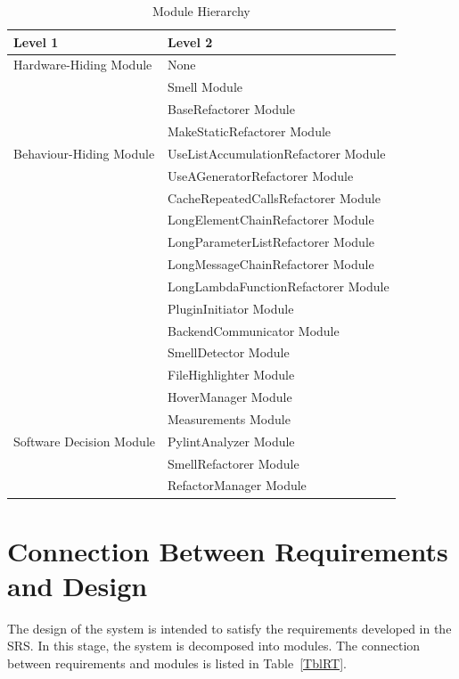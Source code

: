 \documentclass[12pt, titlepage]{article}
\begin{document}
\begin{table}[h!]
\centering
\begin{tabular}{p{} p{}}
\toprule
\textbf{Level 1} & \textbf{Level 2}\\
\midrule

{Hardware-Hiding Module} & None \\
\midrule

\multirow{7}{0.3\textwidth}{Behaviour-Hiding Module} & Smell Module\\
& BaseRefactorer Module\\
& MakeStaticRefactorer Module\\
& UseListAccumulationRefactorer Module\\
& UseAGeneratorRefactorer Module\\
& CacheRepeatedCallsRefactorer Module\\
& LongElementChainRefactorer Module\\
& LongParameterListRefactorer Module\\
& LongMessageChainRefactorer Module\\
& LongLambdaFunctionRefactorer Module\\ 
& PluginInitiator Module\\
& BackendCommunicator Module\\ 
& SmellDetector Module\\
& FileHighlighter Module\\
& HoverManager Module\\
\midrule


\multirow{3}{0.3\textwidth}{Software Decision Module} & Measurements Module\\
& PylintAnalyzer Module\\
& SmellRefactorer Module\\
& RefactorManager Module\\
\bottomrule

\end{tabular}
\caption{Module Hierarchy}
\label{TblMH}
\end{table}

\section{Connection Between Requirements and Design} \label{SecConnection}

The design of the system is intended to satisfy the requirements developed in
the SRS. In this stage, the system is decomposed into modules. The connection
between requirements and modules is listed in Table~\ref{TblRT}.
\end{document}
